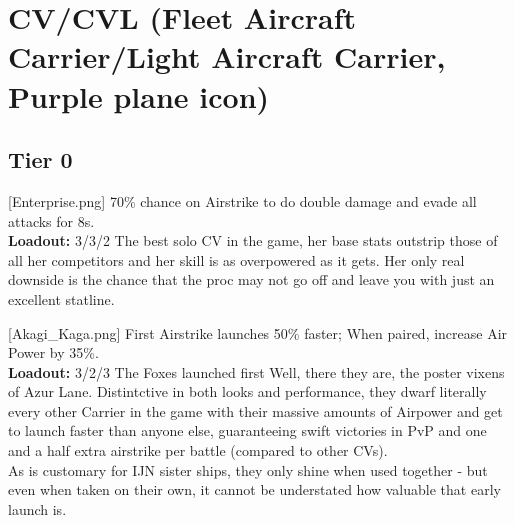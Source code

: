 \newpage
\section[CV/CVL]{CV/CVL (Fleet Aircraft Carrier/Light Aircraft Carrier, Purple plane icon)}
 
\subsection{Tier 0}
[Enterprise.png]
{70\% chance on Airstrike to do double damage and evade all attacks for 8s.\\
\textbf{Loadout:} 3/3/2}
{}
{The best solo CV in the game, her base stats outstrip those of all her competitors and her skill is as overpowered as it gets. Her only real downside is the chance that the proc may not go off and leave you with just an excellent statline.}
 
[Akagi_Kaga.png]
{First Airstrike launches 50\% faster; When paired, increase Air Power by 35\%.\\
\textbf{Loadout:} 3/2/3}
{The Foxes launched first}
{Well, there they are, the poster vixens of Azur Lane. Distintctive in both looks and performance, they dwarf literally every other Carrier in the game with their massive amounts of Airpower and get to launch faster than anyone else, guaranteeing swift victories in PvP and one and a half extra airstrike per battle (compared to other CVs).\\
As is customary for IJN sister ships, they only shine when used together - but even when taken on their own, it cannot be understated how valuable that early launch is.}
 
 
\newpage
